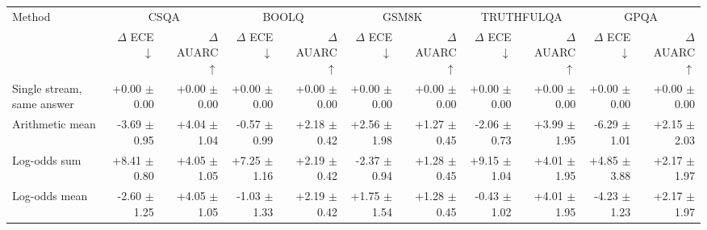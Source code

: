 \begin{tabular}{lrrrrrrrrrr}
\toprule
Method & \multicolumn{2}{c}{CSQA} & \multicolumn{2}{c}{BOOLQ} & \multicolumn{2}{c}{GSM8K} & \multicolumn{2}{c}{TRUTHFULQA} & \multicolumn{2}{c}{GPQA} \\
 & $\Delta$ ECE $\downarrow$ & $\Delta$ AUARC $\uparrow$ & $\Delta$ ECE $\downarrow$ & $\Delta$ AUARC $\uparrow$ & $\Delta$ ECE $\downarrow$ & $\Delta$ AUARC $\uparrow$ & $\Delta$ ECE $\downarrow$ & $\Delta$ AUARC $\uparrow$ & $\Delta$ ECE $\downarrow$ & $\Delta$ AUARC $\uparrow$ \\
\midrule
Single stream, same answer & +0.00 {\scriptsize $\pm$ 0.00} & +0.00 {\scriptsize $\pm$ 0.00} & +0.00 {\scriptsize $\pm$ 0.00} & +0.00 {\scriptsize $\pm$ 0.00} & +0.00 {\scriptsize $\pm$ 0.00} & +0.00 {\scriptsize $\pm$ 0.00} & +0.00 {\scriptsize $\pm$ 0.00} & +0.00 {\scriptsize $\pm$ 0.00} & +0.00 {\scriptsize $\pm$ 0.00} & +0.00 {\scriptsize $\pm$ 0.00} \\
Arithmetic mean & -3.69 {\scriptsize $\pm$ 0.95} & +4.04 {\scriptsize $\pm$ 1.04} & -0.57 {\scriptsize $\pm$ 0.99} & +2.18 {\scriptsize $\pm$ 0.42} & +2.56 {\scriptsize $\pm$ 1.98} & +1.27 {\scriptsize $\pm$ 0.45} & -2.06 {\scriptsize $\pm$ 0.73} & +3.99 {\scriptsize $\pm$ 1.95} & -6.29 {\scriptsize $\pm$ 1.01} & +2.15 {\scriptsize $\pm$ 2.03} \\
Log-odds sum & +8.41 {\scriptsize $\pm$ 0.80} & +4.05 {\scriptsize $\pm$ 1.05} & +7.25 {\scriptsize $\pm$ 1.16} & +2.19 {\scriptsize $\pm$ 0.42} & -2.37 {\scriptsize $\pm$ 0.94} & +1.28 {\scriptsize $\pm$ 0.45} & +9.15 {\scriptsize $\pm$ 1.04} & +4.01 {\scriptsize $\pm$ 1.95} & +4.85 {\scriptsize $\pm$ 3.88} & +2.17 {\scriptsize $\pm$ 1.97} \\
Log-odds mean & -2.60 {\scriptsize $\pm$ 1.25} & +4.05 {\scriptsize $\pm$ 1.05} & -1.03 {\scriptsize $\pm$ 1.33} & +2.19 {\scriptsize $\pm$ 0.42} & +1.75 {\scriptsize $\pm$ 1.54} & +1.28 {\scriptsize $\pm$ 0.45} & -0.43 {\scriptsize $\pm$ 1.02} & +4.01 {\scriptsize $\pm$ 1.95} & -4.23 {\scriptsize $\pm$ 1.23} & +2.17 {\scriptsize $\pm$ 1.97} \\

\end{tabular}
